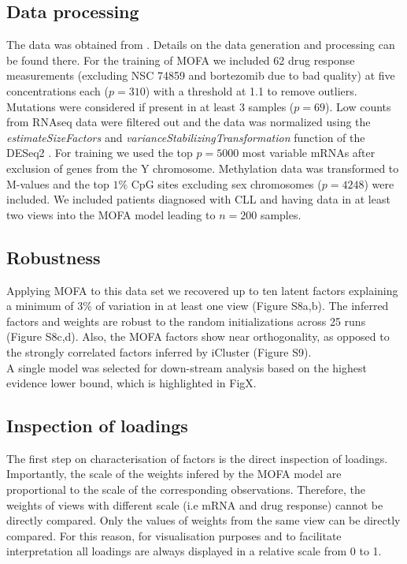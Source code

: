 \documentclass[10pt, a4paper,openany]{report}
\begin{document}
\subsection{Data processing}
{\color{red} The data was obtained from \cite{cllpaper}. Details on the data generation and processing can be found there.}
For the training of MOFA we included 62 drug response measurements (excluding NSC 74859 and bortezomib due to bad quality) at five concentrations each ($p=310$) with a threshold at 1.1 to remove outliers.  Mutations were considered if present in at least 3 samples ($p=69$). Low counts from RNAseq data were filtered out and the data was normalized using the \textit{estimateSizeFactors} and \textit{varianceStabilizingTransformation} function of the DESeq2 \cite{love2014moderated}. For training we used the top $p=5000$ most variable mRNAs after exclusion of genes from the Y chromosome. Methylation data was transformed to M-values and the top $1\%$ CpG sites excluding sex chromosomes ($p=4248$) were included.
We included patients diagnosed with CLL and having data in at least two views into the MOFA model leading to $n=200$ samples.

\subsection{Robustness}
Applying MOFA to this data set we recovered up to ten latent factors explaining a minimum of 3\% of variation in at least one view (Figure S8a,b). The inferred factors and weights are robust to the random initializations across 25 runs (Figure S8c,d). Also, the MOFA factors show near orthogonality, as opposed to the strongly correlated factors inferred by iCluster (Figure S9).\\
A single model was selected for down-stream analysis  based on the highest evidence lower bound, which is highlighted in FigX.

\subsection{Inspection of loadings}
The first step on characterisation of factors is the direct inspection of loadings. Importantly, the scale of the weights infered by the MOFA model are proportional to the scale of the corresponding observations. Therefore, the weights of views with different scale (i.e mRNA and drug response) cannot be directly compared. Only the values of weights from the same view can be directly compared. For this reason, for visualisation purposes and to facilitate interpretation all loadings are always displayed in a relative scale from 0 to 1. \\
\end{document}

